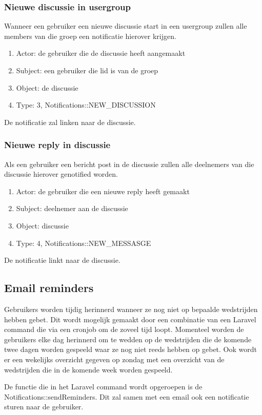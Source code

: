 \documentclass[11pt, a4paper]{article}
\begin{document}
\subsubsection{Nieuwe discussie in usergroup}
Wanneer een gebruiker een nieuwe discussie start in een usergroup zullen alle members van die groep een notificatie hierover krijgen.
\begin{enumerate}
\item Actor: de gebruiker die de discussie heeft aangemaakt
\item Subject: een gebruiker die lid is van de groep
\item Object: de discussie
\item Type: 3, Notifications::NEW\_DISCUSSION
\end{enumerate}
De notificatie zal linken naar de discussie.

\subsubsection{Nieuwe reply in discussie}
Als een gebruiker een bericht post in de discussie zullen alle deelnemers van die discussie hierover genotified worden.
\begin{enumerate}
\item Actor: de gebruiker die een nieuwe reply heeft gemaakt
\item Subject: deelnemer aan de discussie
\item Object: discussie
\item Type: 4, Notifications::NEW\_MESSASGE
\end{enumerate}
De notificatie linkt naar de discussie.

\subsection{Email reminders}
Gebruikers worden tijdig herinnerd wanneer ze nog niet op bepaalde wedstrijden hebben gebet. Dit wordt mogelijk gemaakt door een combinatie van een Laravel command die via een cronjob om de zoveel tijd loopt.
Momenteel worden de gebruikers elke dag herinnerd om te wedden op de wedstrijden die de komende twee dagen worden gespeeld waar ze nog niet reeds hebben op gebet.
Ook wordt er een wekelijks overzicht gegeven op zondag met een overzicht van de wedstrijden die in de komende week worden gespeeld.

De functie die in het Laravel command wordt opgeroepen is de Notifications::sendReminders. Dit zal samen met een email ook een notificatie sturen naar de gebruiker.
\end{document}
